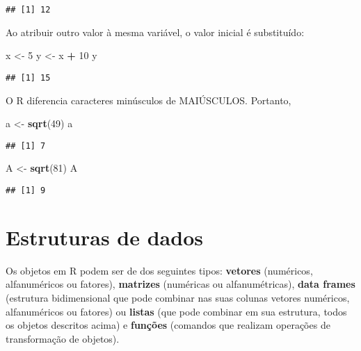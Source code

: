 \documentclass[
]{book}
\newenvironment{Shaded}{\begin{snugshade}}{\end{snugshade}}
\newcommand{\DecValTok}[1]{\textcolor[rgb]{0.00,0.00,0.81}{#1}}
\newcommand{\KeywordTok}[1]{\textcolor[rgb]{0.13,0.29,0.53}{\textbf{#1}}}
\newcommand{\NormalTok}[1]{#1}
\newcommand{\OperatorTok}[1]{\textcolor[rgb]{0.81,0.36,0.00}{\textbf{#1}}}
\newcommand{\StringTok}[1]{\textcolor[rgb]{0.31,0.60,0.02}{#1}}
\begin{document}
\begin{verbatim}
## [1] 12
\end{verbatim}

Ao atribuir outro valor à mesma variável, o valor inicial é substituído:

\begin{Shaded}
\begin{Highlighting}[]
\NormalTok{x <-}\StringTok{ }\DecValTok{5}
\NormalTok{y <-}\StringTok{ }\NormalTok{x }\OperatorTok{+}\StringTok{ }\DecValTok{10}
\NormalTok{y}
\end{Highlighting}
\end{Shaded}

\begin{verbatim}
## [1] 15
\end{verbatim}

O R diferencia caracteres minúsculos de MAIÚSCULOS. Portanto,

\begin{Shaded}
\begin{Highlighting}[]
\NormalTok{a <-}\StringTok{ }\KeywordTok{sqrt}\NormalTok{(}\DecValTok{49}\NormalTok{)}
\NormalTok{a}
\end{Highlighting}
\end{Shaded}

\begin{verbatim}
## [1] 7
\end{verbatim}

\begin{Shaded}
\begin{Highlighting}[]
\NormalTok{A <-}\StringTok{ }\KeywordTok{sqrt}\NormalTok{(}\DecValTok{81}\NormalTok{)}
\NormalTok{A}
\end{Highlighting}
\end{Shaded}

\begin{verbatim}
## [1] 9
\end{verbatim}

\hypertarget{estruturas-de-dados}{%
\section{Estruturas de dados}\label{estruturas-de-dados}}

Os objetos em R podem ser de dos seguintes tipos: \textbf{vetores} (numéricos, alfanuméricos ou fatores), \textbf{matrizes} (numéricas ou alfanumétricas), \textbf{data frames} (estrutura bidimensional que pode combinar nas suas colunas vetores numéricos, alfanuméricos ou fatores) ou \textbf{listas} (que pode combinar em sua estrutura, todos os objetos descritos acima) e \textbf{funções} (comandos que realizam operações de transformação de objetos).
\end{document}
